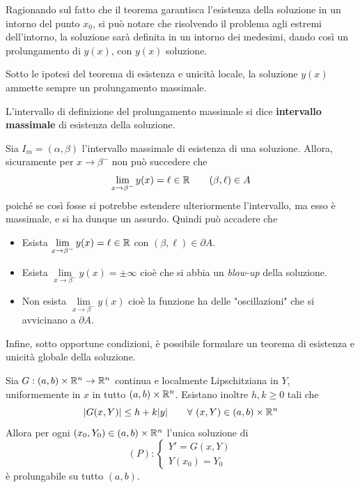 Ragionando sul fatto che il teorema garantisca l'esistenza della soluzione in un intorno del punto $x_0$, si può notare che risolvendo il problema agli estremi dell'intorno, la soluzione sarà definita in un intorno dei medesimi, dando così un prolungamento di $y(x)$, con $y(x)$ soluzione. 
\begin{theorem}
    Sotto le ipotesi del teorema di esistenza e unicità locale, la soluzione $y(x)$ ammette sempre un prolungamento massimale.
\end{theorem}
\begin{definition}
    L'intervallo di definizione del prolungamento massimale si dice \textbf{intervallo massimale} di esistenza della soluzione.
\end{definition}
\begin{oss}
    Sia $I_m=(\alpha, \beta)$ l'intervallo massimale di esistenza di una soluzione. Allora, sicuramente per $x \to \beta^-$ non può succedere che 
        \begin{equation}
            \lim_{x \to \beta^-}{y(x)}= \ell \in \mathbb{R} \qquad (\beta, \ell) \in A
        \end{equation}
        poiché se così fosse si potrebbe estendere ulteriormente l'intervallo, ma esso è massimale, e si ha dunque un assurdo.
        Quindi può accadere che
        \begin{itemize}
            \item Esista $\lim\limits_{x \to \beta^-}{y(x)}= \ell \in \mathbb{R}$
            con $(\beta, \ell) \in \partial A$.
            \item Esista $\lim\limits_{x \to \beta^-}{y(x)}= \pm \infty$
            cioè che si abbia un \textit{blow-up} della soluzione.
            \item Non esista $\lim\limits_{x \to \beta^-}{y(x)}$
                cioè la funzione ha delle "oscillazioni" che si avvicinano a $\partial A$.
            \end{itemize}
\end{oss}
Infine, sotto opportune condizioni, è possibile formulare un teorema di esistenza e unicità globale della soluzione.
\begin{theorem} \label{Teo: Esistenza e unicità globale}
    Sia $G: (a, b) \times \mathbb{R}^n \to \mathbb{R}^n$ continua e localmente Lipschitziana in $Y$, uniformemente in $x$ in tutto $(a, b) \times \mathbb{R}^n$. Esistano inoltre $h,k \geq 0$ tali che 
    \begin{equation}
        \left|G(x, Y)\right| \leq h+ k|y|
    \qquad \forall\ (x, Y) \in (a,b) \times \mathbb{R}^n
    \end{equation}
    Allora per ogni $(x_0, Y_0) \in (a,b) \times \mathbb{R}^n$ l'unica soluzione di 
    \begin{equation}
        (P): \begin{cases}
       Y'=G(x, Y)\\
       Y(x_0)=Y_0
       \end{cases}
    \end{equation}
    è prolungabile su tutto $(a, b)$.
\end{theorem}
